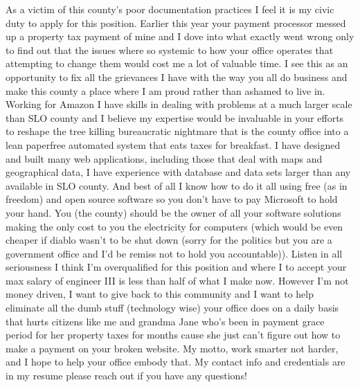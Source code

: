 \documentclass[12pt,stdletter,orderfromtodate,sigleft]{newlfm}
\begin{document}
\begin{newlfm}
As a victim of this county's poor documentation practices I feel it is my civic duty to apply for this position. Earlier this year your payment processor messed up a property tax payment of mine and I dove into what exactly went wrong only to find out that the issues where so systemic to how your office operates that attempting to change them would cost me a lot of valuable time. I see this as an opportunity to fix all the grievances I have with the way you all do business and make this county a place where I am proud rather than ashamed to live in. Working for Amazon I have skills in dealing with problems at a much larger scale than SLO county and I believe my expertise would be invaluable in your efforts to reshape the tree killing bureaucratic nightmare that is the county office into a lean paperfree automated system that eats taxes for breakfast. I have designed and built many web applications, including those that deal with maps and geographical data, I have experience with database and data sets larger than any available in SLO county. And best of all I know how to do it all using free (as in freedom) and open source software so you don't have to pay Microsoft to hold your hand. You (the county) should be the owner of all your software solutions making the only cost to you the electricity for computers (which would be even cheaper if diablo wasn't to be shut down (sorry for the politics but you are a government office and I'd be remiss not to hold you accountable)). Listen in all seriousness I think I'm overqualified for this position and where I to accept your max salary of engineer III is less than half of what I make now. However I'm not money driven, I want to give back to this community and I want to help eliminate all the dumb stuff (technology wise) your office does on a daily basis that hurts citizens like me and grandma Jane who's been in payment grace period for her property taxes for months cause she just can't figure out how to make a payment on your broken website. My motto, work smarter not harder, and I hope to help your office embody that.  My contact info and credentials are in my resume please reach out if you have any questions!
\end{newlfm}
\end{document}
